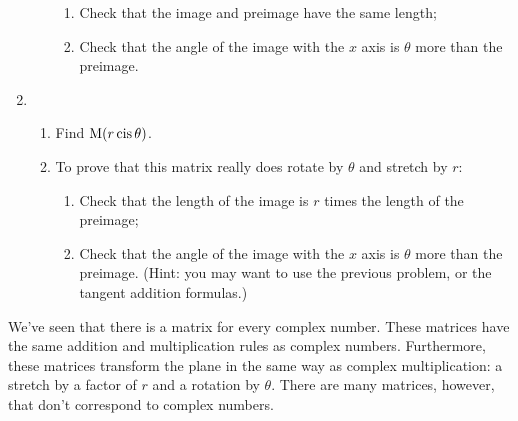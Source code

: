 \documentclass[../textbook.tex]{subfiles}
\begin{document}
\begin{enumerate}
\begin{enumerate}
\begin{enumerate}
\item Check that the image and preimage have the same length;
\item Check that the angle of the image with the $x$ axis is $\theta$ more than the preimage.
\end{enumerate}
\end{enumerate}
\item \begin{enumerate}
\item Find $\operatorname{M} (r\operatorname{cis}\theta)$.
\item To prove that this matrix really does rotate by $\theta$ and stretch by $r$:
\begin{enumerate}
\item Check that the length of the image is $r$ times the length of the preimage;
\item Check that the angle of the image with the $x$ axis is $\theta$ more than the preimage. (Hint: you may want to use the previous problem, or the tangent addition formulas.)
\end{enumerate}
\end{enumerate}
\setcounter{problem_i}{\value{enumi}}
\end{enumerate}

\noindent We've seen that there is a matrix for every complex number. These matrices have the same addition and multiplication rules as complex numbers. Furthermore, these matrices transform the plane in the same way as complex multiplication: a stretch by a factor of $r$ and a rotation by $\theta$. There are many matrices, however, that don't correspond to complex numbers.
\end{document}
